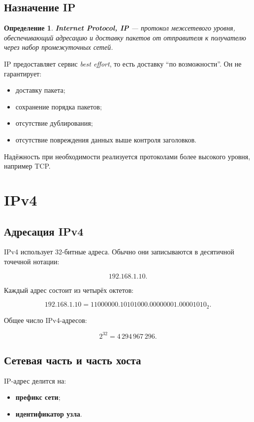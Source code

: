 \documentclass[12pt,a4paper]{article}
\newtheorem{definition}{Определение}
\begin{document}
\subsection{Назначение IP}

\begin{definition}
\textbf{Internet Protocol, IP} --- протокол межсетевого уровня, обеспечивающий адресацию и доставку пакетов от отправителя к получателю через набор промежуточных сетей.
\end{definition}

IP предоставляет сервис \emph{best effort}, то есть доставку ``по возможности''. Он не гарантирует:

\begin{itemize}
    \item доставку пакета;
    \item сохранение порядка пакетов;
    \item отсутствие дублирования;
    \item отсутствие повреждения данных выше контроля заголовков.
\end{itemize}

Надёжность при необходимости реализуется протоколами более высокого уровня, например TCP.

\section{IPv4}

\subsection{Адресация IPv4}

IPv4 использует 32-битные адреса. Обычно они записываются в десятичной точечной нотации:

\[
192.168.1.10.
\]

Каждый адрес состоит из четырёх октетов:

\[
192.168.1.10 =
11000000.10101000.00000001.00001010_2.
\]

Общее число IPv4-адресов:

\[
2^{32} = 4\,294\,967\,296.
\]

\subsection{Сетевая часть и часть хоста}

IP-адрес делится на:

\begin{itemize}
    \item \textbf{префикс сети};
    \item \textbf{идентификатор узла}.
\end{itemize}
\end{document}
